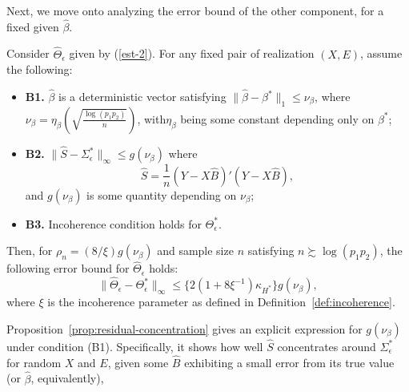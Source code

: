 
% 
%
%
%
\medskip
Next, we move onto analyzing the error bound of the other component, for a fixed given $\widehat{\beta}$. 

\begin{theorem}\label{thm:ErrorBound_Theta}
Consider $\widehat{\Theta}_\epsilon$ given by (\ref{est-2}). For any fixed pair of realization $(X,E)$, assume the following:
\begin{itemize}
\item[] \textbf{B1.} $\widehat{\beta}$ is a deterministic vector satisfying $\|\widehat{\beta}-\beta^*\|_1\leq \nu_\beta$, where $\nu_\beta = \eta_{\beta}\left( \sqrt{\frac{\log(p_1p_2)}{n}}\right)$, with$\eta_\beta$ being some constant depending only on $\beta^*$;
\item[] \textbf{B2.} $\|\widehat{S}-\Sigma^*_\epsilon\|_\infty \leq g({\nu_\beta})$ where 
\begin{equation*}
\widehat{S} = \frac{1}{n}(Y-X\widehat{B})'(Y-X\widehat{B}),
\end{equation*}
and $g({\nu_\beta})$ is some quantity depending on $\nu_\beta$;
\item[] \textbf{B3.} Incoherence condition holds for $\Theta_\epsilon^*$. 
\end{itemize}
Then, for $\rho_n = (8/\xi)g(\nu_\beta)$ and sample size $n$ satisfying $n \succsim \log(p_1p_2)$,
the following error bound for $\widehat{\Theta}_\epsilon$ holds:
\begin{equation}\label{Thetabound}
\|\widehat{\Theta}_\epsilon-\Theta^*_\epsilon\|_\infty\leq \{2(1+8\xi^{-1})\kappa_{H^*}\} g(\nu_\beta),
\end{equation}
where $\xi$ is the incoherence parameter as defined in Definition~\ref{def:incoherence}.
\end{theorem}


Proposition~\ref{prop:residual-concentration} gives an explicit expression for $g(\nu_\beta)$ under condition (B1). Specifically, it shows how well $\widehat{S}$ concentrates around $\Sigma^*_\epsilon$ for random $X$ and $E$, given some $\widehat{B}$ exhibiting a small error from its true value (or $\widehat{\beta}$, equivalently),


